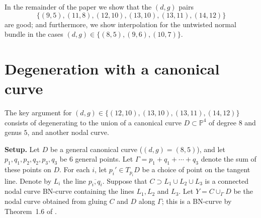 \documentclass[11pt]{amsart}
\newcommand{\pp}{\mathbb{P}}
\renewcommand{\bar}{\overline}
\newtheorem{lem}[thm]{Lemma}
\theoremstyle{definition}
\theoremstyle{remark}
\begin{document}
In the remainder of the paper we show that the $(d,g)$ pairs 
\[\{(9,5), (11,8), (12,10), (13,10), (13,11), (14,12) \} \] 
are good; and furthermore, we show interpolation for the untwisted normal bundle in the cases $(d,g) \in \{ (8,5), (9,6), (10,7)\}$.




\section{Degeneration with a canonical curve}\label{canonical}

The key argument for $(d,g) \in \{(12,10), (13,10), (13,11), (14,12) \} $ consists of degenerating to the union of a canonical curve $D \subset \pp^4$ of degree $8$ and genus $5$, and another nodal curve.

\textbf{Setup.}
Let $D$ be a general canonical curve ($(d,g) = (8,5)$), and let $p_1, q_1, p_2, q_2, p_3, q_3$ be 6 general points.  Let $\Gamma = p_1 +  q_1 + \cdots + q_3$ denote the sum of these points on $D$.  For each $i$, let $p_i' \in T_{p_i}D$ be a choice of point on the tangent line.  Denote by $L_i$ the line $\bar{p_i, q_i}$.  Suppose that $C \supset L_1 \cup L_2 \cup L_3$ is a connected nodal curve BN-curve containing the lines $L_1, L_2$ and $L_3$.  
Let $Y = C \cup_\Gamma D$ be the nodal curve obtained from gluing $C$ and $D$ along $\Gamma$; this is a BN-curve by Theorem~1.6 of \cite{rbn}.
\end{document}
